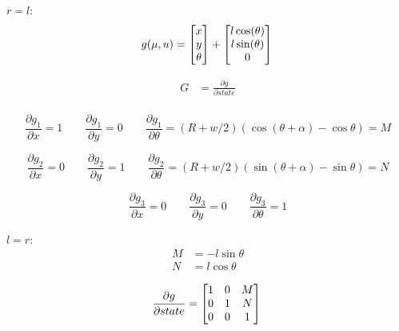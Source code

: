 \documentclass[oneside, 12pt, a4paper]{book}
\begin{document}
$r = l$:
\begin{equation}
    g(\mu, u) = 
    \begin{bmatrix}
        x \\ y \\ \theta
    \end{bmatrix}
    +
    \begin{bmatrix}
        l \cos(\theta) \\
        l \sin(\theta) \\
        0 \\
    \end{bmatrix}\\
\end{equation}

\begin{equation}
    \begin{split}
        G &= \frac{\partial g}{\partial state} \\
    \end{split}
\end{equation}

\begin{equation}
    \frac{\partial g_1}{\partial x} = 1 \qquad
    \frac{\partial g_1}{\partial y} = 0 \qquad
    \frac{\partial g_1}{\partial \theta} = (R+w/2)(\cos{(\theta + \alpha)} - \cos{\theta}) = M
\end{equation}

\begin{equation}
    \frac{\partial g_2}{\partial x} = 0 \qquad
    \frac{\partial g_2}{\partial y} = 1 \qquad
    \frac{\partial g_2}{\partial \theta} = (R+w/2)(\sin{(\theta + \alpha)} - \sin{\theta}) = N
\end{equation}

\begin{equation}
    \frac{\partial g_3}{\partial x} = 0 \qquad
    \frac{\partial g_3}{\partial y} = 0 \qquad
    \frac{\partial g_3}{\partial \theta} = 1
\end{equation}

$l = r$:
\begin{equation}
    \begin{split}
        M &= -l\sin{\theta}\\
        N &= l\cos{\theta}  
    \end{split}
\end{equation}

\begin{equation}
    \frac{\partial g}{\partial state} = \begin{bmatrix}
        1 & 0 & M \\
        0 & 1 & N \\
        0 & 0 & 1 \\ 
    \end{bmatrix}\\
\end{equation}
\end{document}
